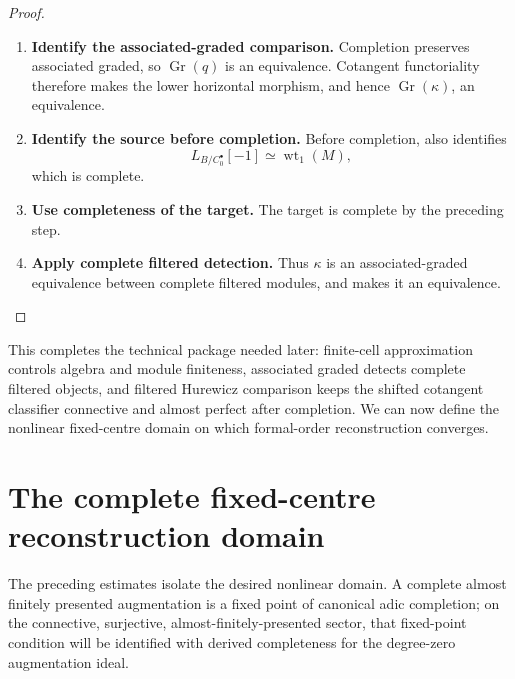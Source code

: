 \begin{proof}
\begin{enumerate}[label=\textup{(\arabic*)}]
\[\begin{tikzcd}[column sep=huge,row sep=large]
        \operatorname{Gr}L_{B/C_0^\bullet}[-1]
            \arrow[r,"\operatorname{Gr}(\kappa)"]
            \arrow[d,"\simeq"']
        &
        \operatorname{Gr}L_{B/C_1^\bullet}[-1]
            \arrow[d,"\simeq"]
        \\
        L_{B/\operatorname{Gr}C_0}[-1]
            \arrow[r]
        &
        L_{B/\operatorname{Gr}C_1}[-1].
    \end{tikzcd}
    \]
    \item \textbf{Identify the associated-graded comparison.}
    Completion preserves associated graded, so
    \(\operatorname{Gr}(q)\) is an equivalence. Cotangent functoriality
    therefore makes the lower horizontal morphism, and hence
    \(\operatorname{Gr}(\kappa)\), an equivalence.
    \item \textbf{Identify the source before completion.}
    Before completion,
     also identifies
    \[
        L_{B/C_0^\bullet}[-1]
        \simeq
        \operatorname{wt}_1(M),
    \]
    which is complete.
    \item \textbf{Use completeness of the target.}
    The target is complete by the preceding step.
    \item \textbf{Apply complete filtered detection.}
    Thus
    \(\kappa\) is an associated-graded equivalence between complete filtered
    modules, and  makes it an equivalence.
\end{enumerate}
\end{proof}


This completes the technical package needed later: finite-cell approximation controls
algebra and module finiteness, associated graded detects complete filtered objects, and
filtered Hurewicz comparison keeps the shifted cotangent classifier connective and
almost perfect after completion. We can now define the nonlinear fixed-centre domain on
which formal-order reconstruction converges.

\section{The complete fixed-centre reconstruction domain}
\label{sec:complete-formal-augmentations}


The preceding estimates isolate the desired nonlinear domain. A complete almost finitely
presented augmentation is a fixed point of canonical adic completion; on the connective,
surjective, almost-finitely-presented sector, that fixed-point condition will be
identified with derived completeness for the degree-zero augmentation ideal.

